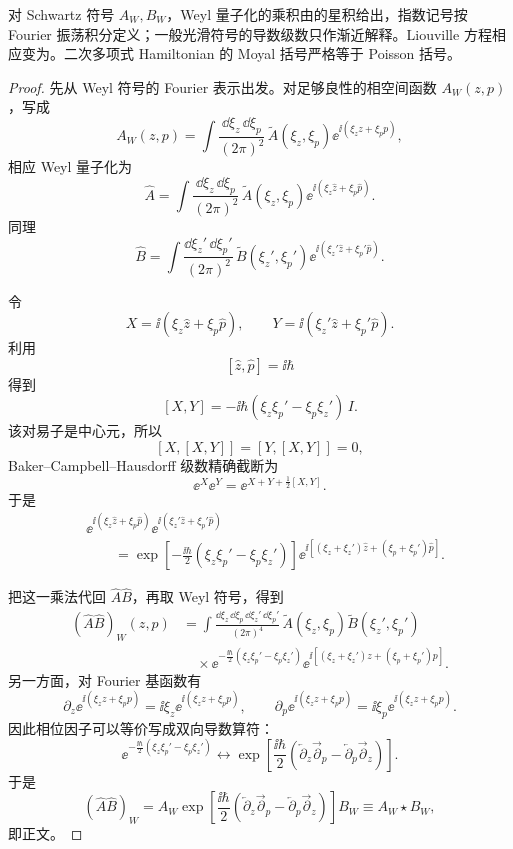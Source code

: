 \begin{theorem}
对 Schwartz 符号 $A_W,B_W$，Weyl 量子化的乘积由的星积给出，指数记号按 Fourier 振荡积分定义；一般光滑符号的导数级数只作渐近解释。Liouville 方程相应变为。二次多项式 Hamiltonian 的 Moyal 括号严格等于 Poisson 括号。
\end{theorem}
\begin{proof}
先从 Weyl 符号的 Fourier 表示出发。对足够良性的相空间函数 \(A_W(z,p)\)，写成
\[
A_W(z,p)
=
\int\frac{\dd\xi_z\,\dd\xi_p}{(2\pi)^2}\,
\widetilde A(\xi_z,\xi_p)
\ee^{\ii(\xi_z z+\xi_p p)},
\]
相应 Weyl 量子化为
\[
\hat A
=
\int\frac{\dd\xi_z\,\dd\xi_p}{(2\pi)^2}\,
\widetilde A(\xi_z,\xi_p)
\ee^{\ii(\xi_z\hat z+\xi_p\hat p)}.
\]
同理
\[
\hat B
=
\int\frac{\dd\xi_z'\,\dd\xi_p'}{(2\pi)^2}\,
\widetilde B(\xi_z',\xi_p')
\ee^{\ii(\xi_z'\hat z+\xi_p'\hat p)}.
\]

令
\[
X=\ii(\xi_z\hat z+\xi_p\hat p),
\qquad
Y=\ii(\xi_z'\hat z+\xi_p'\hat p).
\]
利用
\[
[\hat z,\hat p]=\ii\hbar
\]
得到
\[
[X,Y]
=
-\ii\hbar
(\xi_z\xi_p'-\xi_p\xi_z')\,I.
\]
该对易子是中心元，所以
\[
[X,[X,Y]]
=
[Y,[X,Y]]
=0,
\]
Baker--Campbell--Hausdorff 级数精确截断为
\[
\ee^X\ee^Y
=
\ee^{X+Y+\frac12[X,Y]}.
\]
于是
\begin{align*}
&\ee^{\ii(\xi_z\hat z+\xi_p\hat p)}
\ee^{\ii(\xi_z'\hat z+\xi_p'\hat p)}\\
&\qquad=
\exp\!\left[
-\frac{\ii\hbar}{2}
(\xi_z\xi_p'-\xi_p\xi_z')
\right]
\ee^{\ii[(\xi_z+\xi_z')\hat z+(\xi_p+\xi_p')\hat p]}.
\end{align*}

把这一乘法代回 \(\hat A\hat B\)，再取 Weyl 符号，得到
\begin{align*}
(\hat A\hat B)_W(z,p)
&=
\int
\frac{\dd\xi_z\,\dd\xi_p\,\dd\xi_z'\,\dd\xi_p'}{(2\pi)^4}\,
\widetilde A(\xi_z,\xi_p)
\widetilde B(\xi_z',\xi_p')\\
&\quad\times
\ee^{-\frac{\ii\hbar}{2}(\xi_z\xi_p'-\xi_p\xi_z')}
\ee^{\ii[(\xi_z+\xi_z')z+(\xi_p+\xi_p')p]}.
\end{align*}
另一方面，对 Fourier 基函数有
\[
\partial_z
\ee^{\ii(\xi_z z+\xi_p p)}
=
\ii\xi_z
\ee^{\ii(\xi_z z+\xi_p p)},
\qquad
\partial_p
\ee^{\ii(\xi_z z+\xi_p p)}
=
\ii\xi_p
\ee^{\ii(\xi_z z+\xi_p p)}.
\]
因此相位因子可以等价写成双向导数算符：
\[
\ee^{-\frac{\ii\hbar}{2}(\xi_z\xi_p'-\xi_p\xi_z')}
\longleftrightarrow
\exp\!\left[
\frac{\ii\hbar}{2}
\left(
\overleftarrow\partial_z\overrightarrow\partial_p
-
\overleftarrow\partial_p\overrightarrow\partial_z
\right)
\right].
\]
于是
\[
\boxed{
(\hat A\hat B)_W
=
A_W
\exp\!\left[
\frac{\ii\hbar}{2}
\left(
\overleftarrow\partial_z\overrightarrow\partial_p
-
\overleftarrow\partial_p\overrightarrow\partial_z
\right)
\right]
B_W
\equiv A_W\star B_W,
}
\]
即正文。


\end{proof}
